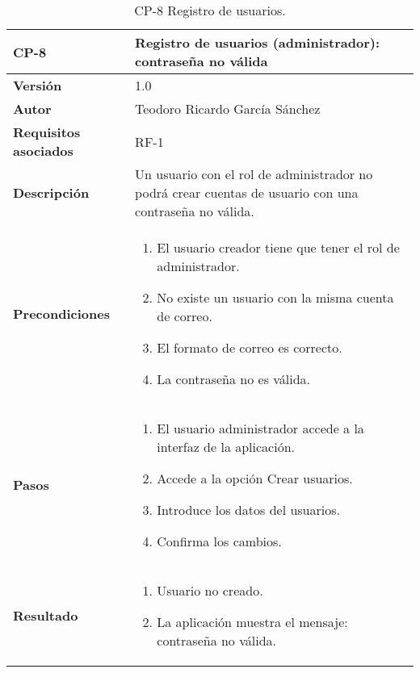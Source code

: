 \begin{table}[p]
	\centering
	\begin{tabularx}{\linewidth}{ p{} p{} }
		\toprule
		\textbf{CP-8}    & \textbf{Registro de usuarios (administrador): contraseña no válida}\\
		\toprule
		\textbf{Versión}              & 1.0    \\
		\textbf{Autor}                & Teodoro Ricardo García Sánchez \\
		\textbf{Requisitos asociados} & RF-1 \\
		\textbf{Descripción}          & Un usuario con el rol de administrador no podrá crear cuentas de usuario con una contraseña no válida. \\
		\textbf{Precondiciones}         & 
		\begin{enumerate}
			\def\labelenumi{\arabic{enumi}.}
			\tightlist
			\item El usuario creador tiene que tener el rol de administrador.
			\item No existe un usuario con la misma cuenta de correo.
			\item El formato de correo es correcto.
			\item La contraseña no es válida.
		\end{enumerate}\\
		\textbf{Pasos}             &
		\begin{enumerate}
			\def\labelenumi{\arabic{enumi}.}
			\tightlist
			\item El usuario administrador accede a la interfaz de la aplicación.
			\item Accede a la opción Crear usuarios.
			\item Introduce los datos del usuarios.
			\item Confirma los cambios.
		\end{enumerate}\\
		\textbf{Resultado}          & 
		\begin{enumerate}
			\item Usuario no creado.
			\item La aplicación muestra el mensaje: contraseña no válida.
		\end{enumerate}\\
		\bottomrule
	\end{tabularx}
	\caption{CP-8 Registro de usuarios.}
\end{table}


